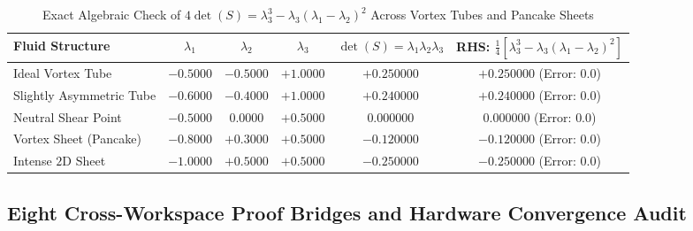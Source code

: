 \documentclass[10pt]{article}
\renewcommand{\_}{\OrigUnderscore\hspace{0pt}}
\numberwithin{equation}{section}
\begin{document}
\begin{table}[htbp]
\centering
\caption{Exact Algebraic Check of $4\det(S) = \lambda_3^3 - \lambda_3(\lambda_1 - \lambda_2)^2$ Across Vortex Tubes and Pancake Sheets}\label{tab:cubic-det-exact}
\small
\begin{tabular}{lccccc}
\toprule
\textbf{Fluid Structure} & $\lambda_1$ & $\lambda_2$ & $\lambda_3$ & $\det(S) = \lambda_1 \lambda_2 \lambda_3$ & RHS: $\frac{1}{4}[\lambda_3^3 - \lambda_3(\lambda_1 - \lambda_2)^2]$ \\
\midrule
Ideal Vortex Tube & $-0.5000$ & $-0.5000$ & $+1.0000$ & $+0.250000$ & $+0.250000$ (Error: $0.0$) \\
Slightly Asymmetric Tube & $-0.6000$ & $-0.4000$ & $+1.0000$ & $+0.240000$ & $+0.240000$ (Error: $0.0$) \\
Neutral Shear Point & $-0.5000$ & $0.0000$ & $+0.5000$ & $0.000000$ & $0.000000$ (Error: $0.0$) \\
Vortex Sheet (Pancake) & $-0.8000$ & $+0.3000$ & $+0.5000$ & $-0.120000$ & $-0.120000$ (Error: $0.0$) \\
Intense $2\mathrm{D}$ Sheet & $-1.0000$ & $+0.5000$ & $+0.5000$ & $-0.250000$ & $-0.250000$ (Error: $0.0$) \\
\bottomrule
\end{tabular}
\end{table}

\subsection{Eight Cross-Workspace Proof Bridges and Hardware Convergence Audit}\label{subsec:ns-eight-bridges}
\end{document}
